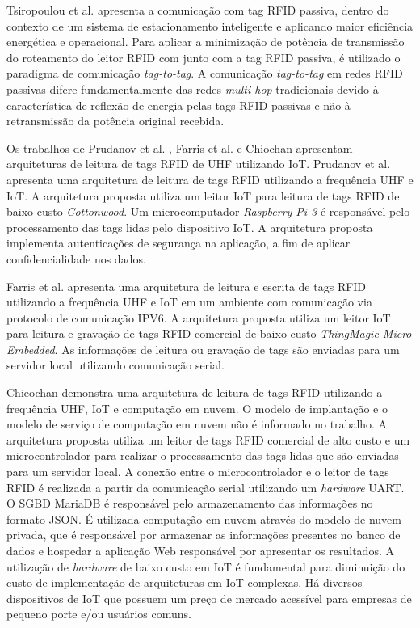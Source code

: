 Tsiropoulou et al. \cite{Tsiropoulou2017RFID-basedSystem} apresenta a comunicação com tag \acrshort{RFID} passiva, dentro do contexto de um sistema de estacionamento inteligente e aplicando maior eficiência energética e operacional. Para aplicar a minimização de potência de transmissão do roteamento do leitor \acrshort{RFID} com junto com a tag \acrshort{RFID} passiva, é utilizado o paradigma de comunicação \textit{tag-to-tag}. A comunicação \textit{tag-to-tag} em redes \acrshort{RFID} passivas difere fundamentalmente das redes \textit{multi-hop} tradicionais devido à característica de reflexão de energia pelas tags \acrshort{RFID} passivas e não à retransmissão da potência original recebida.

Os trabalhos de Prudanov et al. \cite{Prudanov2016}, Farris et al. \cite{Farris2017} e Chiochan \cite{Chieochan2017} apresentam arquiteturas de leitura de tags \acrshort{RFID} de \acrshort{UHF} utilizando \acrshort{IoT}. Prudanov et al. \cite{Prudanov2016} apresenta uma arquitetura de leitura de tags \acrshort{RFID} utilizando a frequência \acrshort{UHF} e \acrshort{IoT}. A arquitetura proposta utiliza um leitor \acrshort{IoT} para leitura de tags \acrshort{RFID} de baixo custo \textit{Cottonwood}. Um microcomputador \textit{Raspberry Pi 3} é responsável pelo processamento das tags lidas pelo dispositivo \acrshort{IoT}. A arquitetura proposta implementa autenticações de segurança na aplicação, a fim de aplicar confidencialidade nos dados.

Farris et al. \cite{Farris2017} apresenta uma arquitetura de leitura e escrita de tags \acrshort{RFID} utilizando a frequência \acrshort{UHF} e \acrshort{IoT} em um ambiente com comunicação via protocolo de comunicação IPV6. A arquitetura proposta utiliza um leitor \acrshort{IoT} para leitura e gravação de tags \acrshort{RFID} comercial de baixo custo \textit{ThingMagic Micro Embedded}. As informações de leitura ou gravação de tags são enviadas para um servidor local utilizando comunicação serial.

Chieochan \cite{Chieochan2017} demonstra uma arquitetura de leitura de tags \acrshort{RFID} utilizando a frequência \acrshort{UHF}, \acrshort{IoT} e computação em nuvem. O modelo de implantação e o modelo de serviço de computação em nuvem não é informado no trabalho. A arquitetura proposta utiliza um leitor de tags \acrshort{RFID} comercial de alto custo e um microcontrolador para realizar o processamento das tags lidas que são enviadas para um servidor local. A conexão entre o microcontrolador e o leitor de tags \acrshort{RFID} é realizada a partir da comunicação serial utilizando um \textit{hardware} \acrshort{UART}. O \acrshort{SGBD} MariaDB é responsável pelo armazenamento das informações no formato \acrshort{JSON}. É utilizada computação em nuvem através do modelo de nuvem privada, que é responsável por armazenar as informações presentes no banco de dados e hospedar a aplicação Web responsável por apresentar os resultados. A utilização de \textit{hardware} de baixo custo em \acrshort{IoT} é fundamental para diminuição do custo de implementação de arquiteturas em \acrshort{IoT} complexas. Há diversos dispositivos de \acrshort{IoT} que possuem um preço de mercado acessível para empresas de pequeno porte e/ou usuários comuns.

